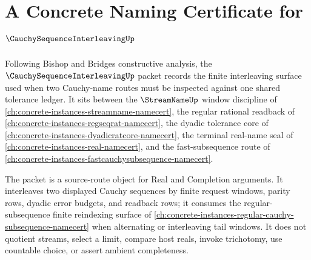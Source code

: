 \chapter{A Concrete Naming Certificate for $\CauchySequenceInterleavingUp$}
\label{ch:concrete-instances-cauchy-sequence-interleaving-namecert}

Following Bishop and Bridges constructive analysis, the $\CauchySequenceInterleavingUp$ packet records the finite interleaving surface used when two Cauchy-name routes must be inspected against one shared tolerance ledger. It sits between the $\StreamNameUp$ window discipline of \autoref{ch:concrete-instances-streamname-namecert}, the regular rational readback of \autoref{ch:concrete-instances-regseqrat-namecert}, the dyadic tolerance core of \autoref{ch:concrete-instances-dyadicratcore-namecert}, the terminal real-name seal of \autoref{ch:concrete-instances-real-namecert}, and the fast-subsequence route of \autoref{ch:concrete-instances-fastcauchysubsequence-namecert}.

The packet is a source-route object for Real and Completion arguments. It interleaves two displayed Cauchy sequences by finite request windows, parity rows, dyadic error budgets, and readback rows; it consumes the regular-subsequence finite reindexing surface of \autoref{ch:concrete-instances-regular-cauchy-subsequence-namecert} when alternating or interleaving tail windows. It does not quotient streams, select a limit, compare host reals, invoke trichotomy, use countable choice, or assert ambient completeness.

